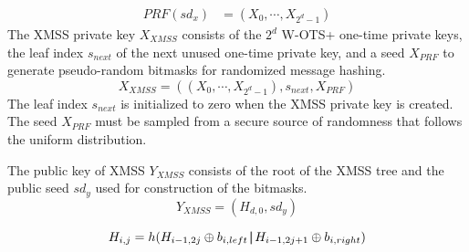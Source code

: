 \begin{align}
\label{eq:prf}
PRF(sd_x) &= (X_0, \cdots, X_{2^d-1})
\end{align}
The XMSS private key $X_{XMSS}$ consists of the $2^d$ W-OTS+ one-time private keys, the leaf index $s_{next}$ of the next unused one-time private key, and a seed $X_{PRF}$ to generate pseudo-random bitmasks for randomized message hashing.
\begin{equation}
\label{eq:priv_key}
X_{XMSS} = ((X_0, \cdots, X_{2^d-1}), s_{next}, X_{PRF})
\end{equation}
The leaf index $s_{next}$ is initialized to zero when the XMSS private key is created. The seed $X_{PRF}$ must be sampled from a secure source of randomness that follows the uniform distribution.  

The public key of XMSS $Y_{XMSS}$ consists of the root of the XMSS tree and the public seed  $sd_y$ used for construction of the bitmasks.
\begin{equation}
\label{eq:xmss_pubkey}
Y_{XMSS} = (H_{d,0}, sd_y)
\end{equation}








\begin{equation}
\label{eq:xmss_bitmasks}
H_{i,j} =  h(H_{i-1,2j} \oplus b_{i,left} \operatorname{|\!\!|} H_{i-1,2j+1} \oplus b_{i,right})
\end{equation}

